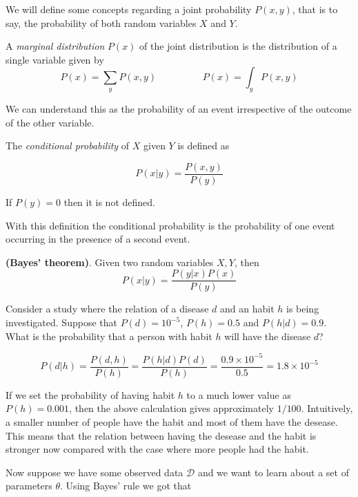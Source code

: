 We will define some concepts regarding a joint probability \(P(x,y)\), that is
to say, the probability of both random variables \(X\) and \(Y\).

\begin{definition}
A \emph{marginal distribution} \(P(x)\) of the joint distribution is the
distribution of a single variable given by
\[
P(x) = \sum_y P(x,y) \hspace{2cm} P(x) = \int_y P(x,y)
\]
\end{definition}

We can understand this as the probability of an event irrespective of the outcome
of the other variable.

\begin{definition}
The \emph{conditional probability} of \(X\) given \(Y\) is defined as

\[
P(x|y) = \frac{P(x,y)}{P(y)}
\]

If \(P(y) = 0\) then it is not defined.
\end{definition}

With this definition the
conditional probability is the probability of one event occurring in the presence of a
second event. \\

\begin{theorem}
  \textbf{(Bayes' theorem)}. Given two random variables \(X,Y\), then
  \[
  P(x|y)= \frac{P(y|x)P(x)}{P(y)}
  \]
\end{theorem}

\begin{exampleth}
Consider a study where the relation of a disease \(d\) and an habit \(h\)
is being investigated. Suppose that \(P(d)=10^{-5}\), \(P(h)=0.5\) and \(P(h|d) = 0.9\). What is the
probability that a person with habit \(h\) will have the disease \(d\)?

\[
P(d|h) = \frac{P(d,h)}{P(h)} = \frac{P(h|d)P(d)}{P(h)} =
\frac{ 0.9 \times 10^{-5}}{ 0.5 } = 1.8 \times 10^{-5}
\]

If we set the probability of having habit \(h\) to a much lower value as \(P(h) =
0.001\), then the above calculation gives approximately \(1/100\). Intuitively, a smaller number of people have the habit and most of them have the
desease. This means that the relation between having the desease and the habit
is stronger now compared with the case where more people had the habit.
\end{exampleth}

Now suppose we have some observed data \(\mathcal{D}\) and we want to learn about
a set of parameters \(\theta\). Using Bayes' rule we got that


